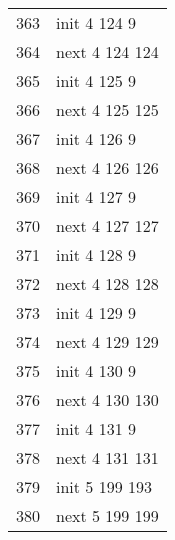 \begin{center}
\begin{tabular}[h!]{>{\ttfamily\color{UniRed}}r >{\ttfamily}l  }
        363 & init \color{UniGrey} 4 \color{UniRed} 124 9   \\
        364 & next \color{UniGrey} 4 \color{UniRed} 124 124 \\
        365 & init \color{UniGrey} 4 \color{UniRed} 125 9   \\
        366 & next \color{UniGrey} 4 \color{UniRed} 125 125 \\
        367 & init \color{UniGrey} 4 \color{UniRed} 126 9   \\
        368 & next \color{UniGrey} 4 \color{UniRed} 126 126 \\
        369 & init \color{UniGrey} 4 \color{UniRed} 127 9   \\
        370 & next \color{UniGrey} 4 \color{UniRed} 127 127 \\
        371 & init \color{UniGrey} 4 \color{UniRed} 128 9   \\
        372 & next \color{UniGrey} 4 \color{UniRed} 128 128 \\
        373 & init \color{UniGrey} 4 \color{UniRed} 129 9   \\
        374 & next \color{UniGrey} 4 \color{UniRed} 129 129 \\
        375 & init \color{UniGrey} 4 \color{UniRed} 130 9   \\
        376 & next \color{UniGrey} 4 \color{UniRed} 130 130 \\
        377 & init \color{UniGrey} 4 \color{UniRed} 131 9   \\
        378 & next \color{UniGrey} 4 \color{UniRed} 131 131 \\
        379 & init \color{UniGrey} 5 \color{UniRed} 199 193 \\
        380 & next \color{UniGrey} 5 \color{UniRed} 199 199
    \end{tabular}
\end{center}

